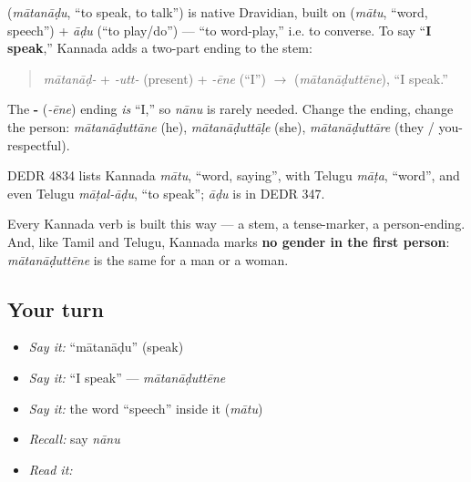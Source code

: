 \begin{cousinweb}
\textbf{} (\emph{mātanāḍu}, \textquotedblleft{}to speak, to talk\textquotedblright{}) is native Dravidian, built on \textbf{} (\emph{mātu}, \textquotedblleft{}word, speech\textquotedblright{}) + \emph{āḍu} (\textquotedblleft{}to play/do\textquotedblright{}) — \textquotedblleft{}to word-play,\textquotedblright{} i.e. to converse. To say \textquotedblleft{}\textbf{I speak},\textquotedblright{} Kannada adds a two-part ending to the stem:

\begin{quote}
\emph{mātanāḍ-} + \emph{-utt-} (present) + \emph{-ēne} (\textquotedblleft{}I\textquotedblright{}) $\to$ \textbf{} (\emph{mātanāḍuttēne}), \textquotedblleft{}I speak.\textquotedblright{}
\end{quote}

The \textbf{-} (\emph{-ēne}) ending \emph{is} \textquotedblleft{}I,\textquotedblright{} so \emph{nānu} is rarely needed. Change the ending, change the person: \emph{mātanāḍuttāne} (he), \emph{mātanāḍuttāḷe} (she), \emph{mātanāḍuttāre} (they / you-respectful).

DEDR 4834 lists Kannada \emph{mātu}, \textquotedblleft{}word, saying\textquotedblright{}, with Telugu \emph{māṭa}, \textquotedblleft{}word\textquotedblright{}, and even Telugu \emph{māṭal-āḍu}, \textquotedblleft{}to speak\textquotedblright{}; \emph{āḍu} is in DEDR 347.
\end{cousinweb}

\begin{grammarlens}[title={Grammar Lens: stem + tense + person}]
Every Kannada verb is built this way — a stem, a tense-marker, a person-ending. And, like Tamil and Telugu, Kannada marks \textbf{no gender in the first person}: \emph{mātanāḍuttēne} is the same for a man or a woman.
\end{grammarlens}

\subsection*{Your turn}
\begin{itemize}
\raggedright
  \item \emph{Say it:} \textquotedblleft{}mātanāḍu\textquotedblright{} (speak)
  \item \emph{Say it:} \textquotedblleft{}I speak\textquotedblright{} — \emph{mātanāḍuttēne}
  \item \emph{Say it:} the word \textquotedblleft{}speech\textquotedblright{} inside it (\emph{mātu})
  \item \emph{Recall:} say \emph{nānu}
  \item \emph{Read it:} \textbf{}
\end{itemize}

